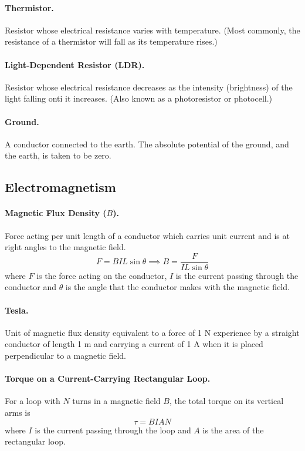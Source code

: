 \documentclass{article}
\begin{document}
\paragraph{Thermistor.} Resistor whose electrical resistance varies with temperature. (Most commonly, the resistance of a thermistor will fall as its temperature rises.)

\paragraph{Light-Dependent Resistor (LDR).} Resistor whose electrical resistance decreases as the intensity (brightness) of the light falling onti it increases. (Also known as a photoresistor or photocell.)

\paragraph{Ground.} A conductor connected to the earth. The absolute potential of the ground, and the earth, is taken to be zero.

\subsection{Electromagnetism}

\paragraph{Magnetic Flux Density ($B$).} Force acting per unit length of a conductor which carries unit current and is at right angles to the magnetic field. \begin{equation}
F = BIL\sin\theta \implies B = \frac{F}{IL\sin\theta}
\end{equation} where $F$ is the force acting on the conductor, $I$ is the current passing through the conductor and $\theta$ is the angle that the conductor makes with the magnetic field.

\paragraph{Tesla.} Unit of magnetic flux density equivalent to a force of 1 N experience by a straight conductor of length 1 m and carrying a current of 1 A when it is placed perpendicular to a magnetic field.

\paragraph{Torque on a Current-Carrying Rectangular Loop.} For a loop with $N$ turns in a magnetic field $B$, the total torque on its vertical arms is \begin{equation}
\tau = BIAN
\end{equation} where $I$ is the current passing through the loop and $A$ is the area of the rectangular loop.
\end{document}
